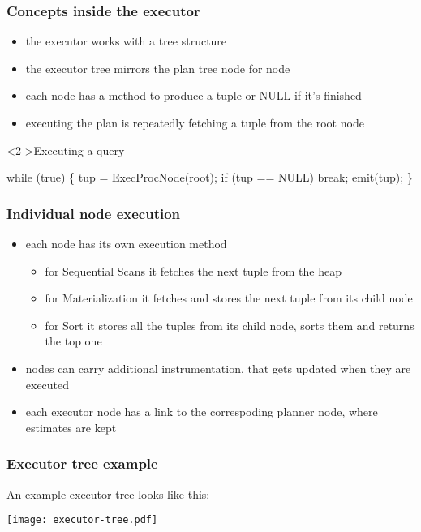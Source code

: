 \documentclass{beamer}
\begin{document}
\begin{frame}[fragile]
  \frametitle{Concepts inside the executor}

  \begin{itemize}
  \item the executor works with a tree structure
  \item the executor tree mirrors the plan tree node for node
  \item each node has a method to produce a tuple or NULL if it's finished
  \item executing the plan is repeatedly fetching a tuple from the root node
  \end{itemize}

  \begin{block}<2->{Executing a query}
    \begin{semiverbatim}
      while (true) \{
          tup = ExecProcNode(root);
          if (tup == NULL)
              break;
          emit(tup);
      \}
    \end{semiverbatim}
  \end{block}
\end{frame}

\begin{frame}
  \frametitle{Individual node execution}

  \begin{itemize}
  \item each node has its own execution method
    \begin{itemize}
    \item for Sequential Scans it fetches the next tuple from the heap
    \item for Materialization it fetches and stores the next tuple from its
      child node
    \item for Sort it stores \alert{all the tuples} from its child node, sorts
      them and returns the top one
    \end{itemize}
  \item nodes can carry additional instrumentation, that gets updated when they
    are executed
  \item each executor node has a link to the correspoding planner node, where
    estimates are kept
  \end{itemize}
\end{frame}

\begin{frame}
  \frametitle{Executor tree example}

  An example executor tree looks like this:
  \begin{center}
    \texttt{[image: executor-tree.pdf]}
  \end{center}
\end{frame}
\end{document}
